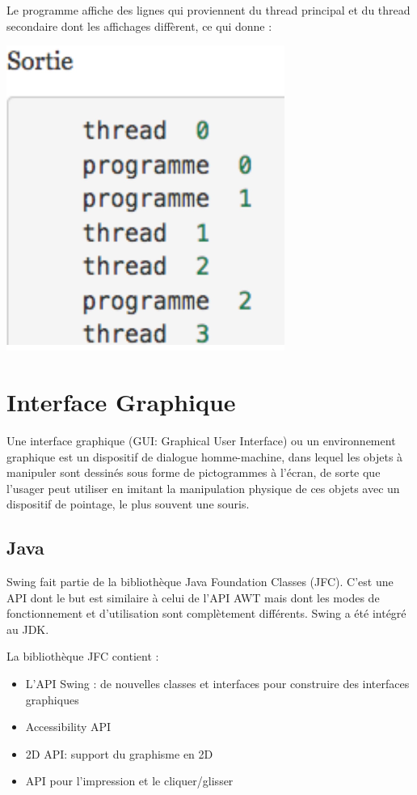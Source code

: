 \documentclass{article}
\begin{document}
Le programme affiche des lignes qui proviennent du thread principal et du thread secondaire dont les affichages diffèrent, ce qui donne :

\begin{center}
  \includegraphics[scale=0.5]{threadS.png}
\end{center}

\section{Interface Graphique}
Une interface graphique (GUI: Graphical User Interface) ou un environnement graphique est un dispositif de dialogue homme-machine, dans lequel les objets à manipuler sont dessinés sous forme de pictogrammes à l'écran, de sorte que l'usager peut utiliser en imitant la manipulation physique de ces objets avec un dispositif de pointage, le plus souvent une souris.

\subsection{Java}
Swing fait partie de la bibliothèque Java Foundation Classes (JFC). C'est une API dont le but est similaire à celui de l'API AWT mais dont les modes de fonctionnement et d'utilisation sont complètement différents. Swing a été intégré au JDK. 

La bibliothèque JFC contient : 

\begin{itemize}
\item L'API Swing : de nouvelles classes et interfaces pour construire des interfaces graphiques
\item Accessibility API
\item 2D API: support du graphisme en 2D
\item API pour l'impression et le cliquer/glisser
\end{itemize}
\end{document}
